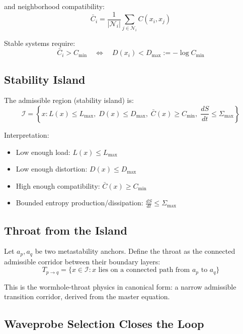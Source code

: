 \documentclass[11pt,a4paper]{article}
\begin{document}
and neighborhood compatibility:
\begin{equation}
\bar{C}_i = \frac{1}{|\mathcal{N}_i|} \sum_{j \in \mathcal{N}_i} C(x_i, x_j)
\label{eq:neighborhood_compat}
\end{equation}

Stable systems require:
\begin{equation}
\bar{C}_i > C_{\min} \quad \Leftrightarrow \quad D(x_i) < D_{\max} := -\log C_{\min}
\label{eq:stability_condition}
\end{equation}

\subsection{Stability Island}

The admissible region (stability island) is:
\begin{equation}
\mathcal{I} = \left\{ x : L(x) \leq L_{\max}, \; D(x) \leq D_{\max}, \; \bar{C}(x) \geq C_{\min}, \; \frac{dS}{dt} \leq \Sigma_{\max} \right\}
\label{eq:stability_island}
\end{equation}

Interpretation:
\begin{itemize}
    \item Low enough load: $L(x) \leq L_{\max}$
    \item Low enough distortion: $D(x) \leq D_{\max}$
    \item High enough compatibility: $\bar{C}(x) \geq C_{\min}$
    \item Bounded entropy production/dissipation: $\frac{dS}{dt} \leq \Sigma_{\max}$
\end{itemize}

\subsection{Throat from the Island}

Let $a_p, a_q$ be two metastability anchors. Define the throat as the connected admissible corridor between their boundary layers:
\begin{equation}
T_{p \to q} = \{ x \in \mathcal{I} : x \text{ lies on a connected path from } a_p \text{ to } a_q \}
\label{eq:throat_definition}
\end{equation}

This is the wormhole-throat physics in canonical form: a narrow admissible transition corridor, derived from the master equation.

\subsection{Waveprobe Selection Closes the Loop}
\end{document}
